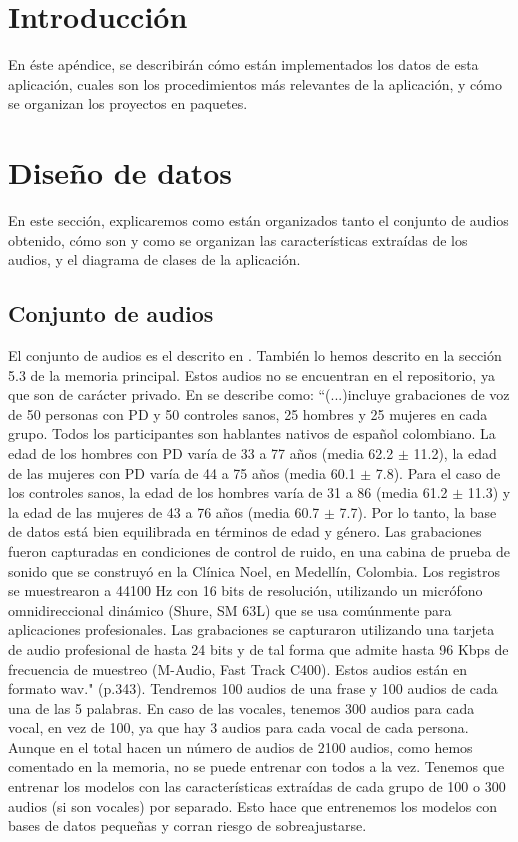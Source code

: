 
\section{Introducción}
En éste apéndice, se describirán cómo están implementados los datos de esta aplicación, cuales son los procedimientos más relevantes de la aplicación, y cómo se organizan los proyectos en paquetes.

\section{Diseño de datos}
En este sección, explicaremos como están organizados tanto el conjunto de audios obtenido, cómo son y como se organizan las características extraídas de los audios, y el diagrama de clases de la aplicación.

\subsection{Conjunto de audios}
El conjunto de audios es el descrito en \cite{OrzCorpus}. También lo hemos descrito en la sección 5.3 de la memoria principal. Estos audios no se encuentran en el repositorio, ya que son de carácter privado. En \cite{OrzCorpus} se describe como: ``(...)incluye grabaciones de voz de 50 personas con PD y 50 controles sanos, 25 hombres y 25 mujeres en cada grupo. Todos los participantes son hablantes nativos de español colombiano. La edad de los hombres con PD varía de 33 a 77 años (media 62.2 $\pm$ 11.2), la edad de las mujeres con PD varía de 44 a 75 años (media 60.1 $\pm$ 7.8). Para el caso de los controles sanos, la edad de los hombres varía de 31 a 86 (media 61.2 $\pm$ 11.3) y la edad de las mujeres de 43 a 76 años (media 60.7 $\pm$ 7.7). Por lo tanto, la base de datos está bien equilibrada en términos de edad y género. Las grabaciones fueron capturadas en condiciones de control de ruido, en una cabina de prueba de sonido que se construyó en la Clínica Noel, en Medellín, Colombia. Los registros se muestrearon a 44100 Hz con 16 bits de resolución, utilizando un micrófono omnidireccional dinámico (Shure, SM 63L) que se usa comúnmente para aplicaciones profesionales. Las grabaciones se capturaron utilizando una tarjeta de audio profesional de hasta 24 bits y de tal forma que admite hasta 96 Kbps de frecuencia de muestreo (M-Audio, Fast Track C400). Estos audios están en formato wav." (p.343). Tendremos 100 audios de una frase y 100 audios de cada una de las 5 palabras. En caso de las vocales, tenemos 300 audios para cada vocal, en vez de 100, ya que hay 3 audios para cada vocal de cada persona. Aunque en el total hacen un número de audios de 2100 audios, como hemos comentado en la memoria, no se puede entrenar con todos a la vez. Tenemos que entrenar los modelos con las características extraídas de cada grupo de 100 o 300 audios (si son vocales) por separado. Esto hace que entrenemos los modelos con bases de datos pequeñas y corran riesgo de sobreajustarse.

